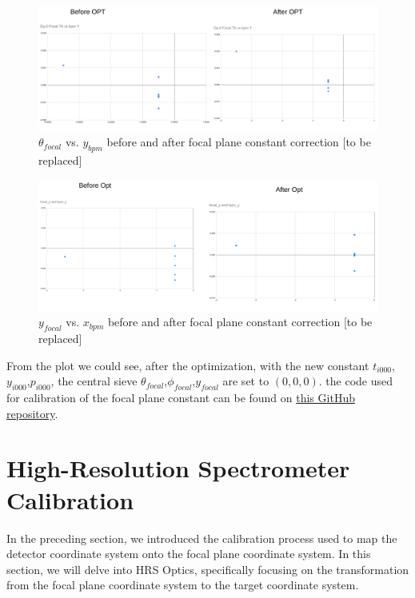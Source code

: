 \begin{figure}
    \centering
    \includegraphics[width =\textwidth]{images/chap4/vdcconstant_focal_th_bpmy.png}
    \caption{$\theta_{focal}$ vs. $y_{bpm}$ before and after focal plane constant correction [to be replaced]}
    \label{fig:my_label}
\end{figure}

\begin{figure}
    \centering
    \includegraphics[width =\textwidth]{images/chap4/vdcconstant_focaly_bpmy.png}
    \caption{$y_{focal}$ vs. $x_{bpm}$ before and after focal plane constant correction [to be replaced]}
    \label{fig:my_label}
\end{figure}

From the plot we could see, after the optimization, with the new constant $t_{i000}$,$y_{i000}$,$p_{i000}$, the central sieve $\theta_{focal}$,$\phi_{focal}$,$y_{focal}$ are set to $(0,0,0)$. the code used for calibration of the focal plane constant can be found on  \href{https://github.com/Jiansiyu/GeneralScripts/blob/master/vdcConstantOpt}{this GitHub repository}.


\section{High-Resolution Spectrometer Calibration}

In the preceding section, we introduced the calibration process used to map the detector coordinate system onto the focal plane coordinate system. In this section, we will delve into HRS Optics, specifically focusing on the transformation from the focal plane coordinate system to the target coordinate system.

